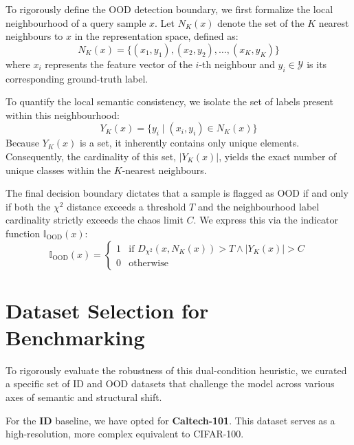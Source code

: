 \documentclass[oneside]{ctuthesis}
\begin{document}
To rigorously define the OOD detection boundary, we first formalize the local neighbourhood of a query sample $x$. Let $N_K(x)$ denote the set of the $K$ nearest neighbours to $x$ in the representation space, defined as:
\begin{equation}
    N_K(x) = \{(x_1, y_1), (x_2, y_2), \dots, (x_K, y_K)\}
\end{equation}
where $x_i$ represents the feature vector of the $i$-th neighbour and $y_i \in \mathcal{Y}$ is its corresponding ground-truth label.

To quantify the local semantic consistency, we isolate the set of labels present within this neighbourhood:
\begin{equation}
    Y_K(x) = \{y_i \mid (x_i, y_i) \in N_K(x)\}
\end{equation}
Because $Y_K(x)$ is a set, it inherently contains only unique elements. Consequently, the cardinality of this set, $|Y_K(x)|$, yields the exact number of unique classes within the $K$-nearest neighbours.

The final decision boundary dictates that a sample is flagged as OOD if and only if both the $\chi^2$ distance exceeds a threshold $T$ and the neighbourhood label cardinality strictly exceeds the chaos limit $C$. We express this via the indicator function $\mathbb{I}_{\text{OOD}}(x)$:
\begin{equation}
    \mathbb{I}_{\text{OOD}}(x) = 
    \begin{cases} 
      1 & \text{if } D_{\chi^2}(x, N_K(x)) > T \land |Y_K(x)| > C \\
      0 & \text{otherwise}
   \end{cases}
\end{equation}

\section{Dataset Selection for Benchmarking}
\label{sec:ood_datasets}

To rigorously evaluate the robustness of this dual-condition heuristic, we curated a specific set of ID and OOD datasets that challenge the model across various axes of semantic and structural shift.

For the \textbf{ID} baseline, we have opted for \textbf{Caltech-101}. This dataset serves as a high-resolution, more complex equivalent to CIFAR-100.
\end{document}
